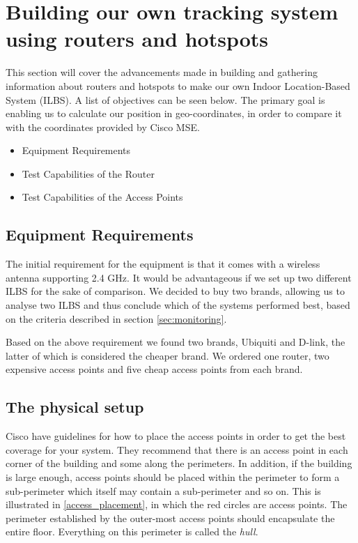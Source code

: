 \section{Building our own tracking system using routers and hotspots}
This section will cover the advancements made in building and gathering information about routers and hotspots to make our own Indoor Location-Based System (ILBS). A list of objectives can be seen below. The primary goal is enabling us to calculate our position in geo-coordinates, in order to compare it with the coordinates provided by Cisco MSE.

\begin{itemize}
	\item Equipment Requirements
	\item Test Capabilities of the Router 
	\item Test Capabilities of the Access Points
\end{itemize}

\subsection*{Equipment Requirements}
The initial requirement for the equipment is that it comes with a wireless antenna supporting 2.4 GHz. It would be advantageous if we set up two different ILBS for the sake of comparison. We decided to buy two brands, allowing us to analyse two ILBS and thus conclude which of the systems performed best, based on the criteria described in section \ref{sec:monitoring}.

Based on the above requirement we found two brands, Ubiquiti and D-link, the latter of which is considered the cheaper brand. We ordered one router, two expensive access points and five cheap access points from each brand.

\subsection*{The physical setup}
Cisco\cite{access_point_placement} have guidelines for how to place the access points in order to get the best coverage for your system. They recommend that there is an access point in each corner of the building and some along the perimeters. In addition, if the building is large enough, access points should be placed within the perimeter to form a sub-perimeter which itself may contain a sub-perimeter and so on. This is illustrated in \cref{access_placement}, in which the red circles are access points. The perimeter established by the outer-most access points should encapsulate the entire floor. Everything on this perimeter is called the \textit{hull}\cite{access_point_placement}.

